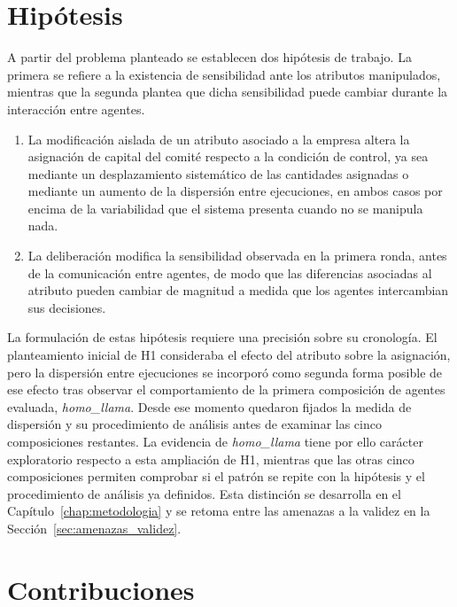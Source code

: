 \section{Hipótesis}
\label{sec:hipotesis}

A partir del problema planteado se establecen dos hipótesis de trabajo. La primera se refiere a la existencia de sensibilidad ante los atributos manipulados, mientras que la segunda plantea que dicha sensibilidad puede cambiar durante la interacción entre agentes.

\begin{enumerate}
	
	\item[\textbf{H1.}] La modificación aislada de un atributo asociado a la empresa altera la asignación de capital del comité respecto a la condición de control, ya sea mediante un desplazamiento sistemático de las cantidades asignadas o mediante un aumento de la dispersión entre ejecuciones, en ambos casos por encima de la variabilidad que el sistema presenta cuando no se manipula nada.
	
	\item[\textbf{H2.}] La deliberación modifica la sensibilidad observada en la primera ronda, antes de la comunicación entre agentes, de modo que las diferencias asociadas al atributo pueden cambiar de magnitud a medida que los agentes intercambian sus decisiones.
	
\end{enumerate}

La formulación de estas hipótesis requiere una precisión sobre su cronología. El planteamiento inicial de H1 consideraba el efecto del atributo sobre la asignación, pero la dispersión entre ejecuciones se incorporó como segunda forma posible de ese efecto tras observar el comportamiento de la primera composición de agentes evaluada, \textit{homo\_llama}. Desde ese momento quedaron fijados la medida de dispersión y su procedimiento de análisis antes de examinar las cinco composiciones restantes. La evidencia de \textit{homo\_llama} tiene por ello carácter exploratorio respecto a esta ampliación de H1, mientras que las otras cinco composiciones permiten comprobar si el patrón se repite con la hipótesis y el procedimiento de análisis ya definidos. Esta distinción se desarrolla en el Capítulo~\ref{chap:metodologia} y se retoma entre las amenazas a la validez en la Sección~\ref{sec:amenazas_validez}.

\section{Contribuciones}
\label{sec:contribuciones}

